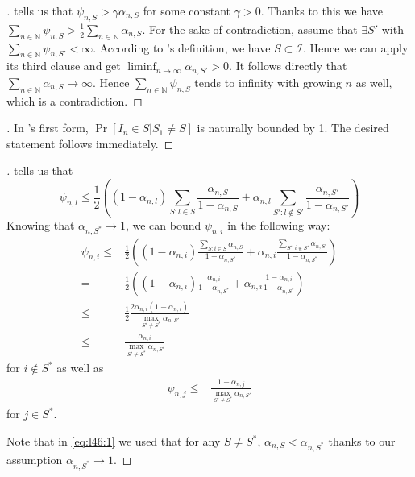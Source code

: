 \begin{proof}[]
   tells us that $\psi_{n, S} > \gamma
  \alpha_{n, S}$ for some constant $\gamma > 0$. Thanks to this we have $\sum_{n
  \in \mathbb{N}} \psi_{n, S} > \frac{1}{2} \sum_{n \in \mathbb{N}} \alpha_{n,
  S}$. For the sake of contradiction, assume that $\exists S'$ with $\sum_{n \in
  \mathbb{N}} \psi_{n, S'} < \infty$. According to
  's definition, we have $S \subset \mathcal{I}$.
  Hence we can apply its third clause and get $\liminf_{n \rightarrow \infty}
  \alpha_{n, S'} > 0$. It follows directly that $\sum_{n \in \mathbb{N}}
  \alpha_{n, S} \rightarrow \infty$. Hence $\sum_{n \in \mathbb{N}} \psi_{n, S}$
  tends to infinity with growing $n$ as well, which is a contradiction.
\end{proof}

\begin{proof}[]
  In 's first form,  $\Pr[I_n \in S | S_1
  \neq S]$ is naturally bounded by 1. The desired statement follows immediately.
\end{proof}

\begin{proof}[]
   tells us that
  \[\psi_{n, l} \leq \frac{1}{2}((1 - \alpha_{n, l}) \sum_{S: l \in S}
      \frac{\alpha_{n, S}}{1 - \alpha_{n, S}} + \alpha_{n, l}
      \sum_{S': l \notin S'} \frac{\alpha_{n, S'}}{1 - \alpha_{n, S'}})\]
  Knowing that $\alpha_{n, S^*} \rightarrow 1$, we can bound $\psi_{n, i}$ in
  the following way:
  \begin{align}
    \psi_{n, i} \leq& \frac{1}{2}((1 - \alpha_{n, i}) \frac{\sum_{S: i \in S}
        \alpha_{n, S}}{1 - \alpha_{n, S^*}} + \alpha_{n, i} \frac{\sum_{S': i
        \notin S'} \alpha_{n, S'}}{1 - \alpha_{n, S^*}}) \label{eq:l46:1}\\
      =& \frac{1}{2}((1 - \alpha_{n, i}) \frac{\alpha_{n, i}}{1 - \alpha_{n,
          S^*}} + \alpha_{n, i} \frac{1 - \alpha_{n, i}}{1 - \alpha_{n, S^*}})\\
      \leq& \frac{1}{2} \frac{2 \alpha_{n, i} (1 - \alpha_{n, i})}{\max_{S'
          \neq S^*} \alpha_{n, S'}} \\
      \leq& \frac{\alpha_{n, i}}{\max_{S' \neq S^*} \alpha_{n, S'}}
  \end{align}
  for $i \notin S^*$ as well as
  \begin{align}
    \psi_{n, j} \leq& \frac{1 - \alpha_{n, j}}{\max_{S' \neq S^*} \alpha_{n,
        S'}}
  \end{align}
  for $j \in S^*$.

  Note that in \eqref{eq:l46:1} we used that for any $S \neq S^*$, $\alpha_{n,
  S} < \alpha_{n, S^*}$ thanks to our assumption $\alpha_{n, S^*} \rightarrow
  1$.
\end{proof}

